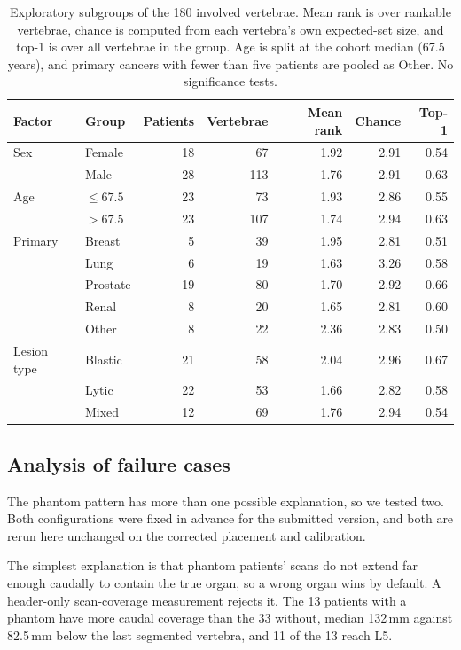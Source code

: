 \documentclass[10pt]{article}
\begin{document}
\begin{table}[!htbp]
\centering
\small
\caption{Exploratory subgroups of the 180 involved vertebrae. Mean rank is over
rankable vertebrae, chance is computed from each vertebra's own expected-set size,
and top-1 is over all vertebrae in the group. Age is split at the cohort median
(67.5 years), and primary cancers with fewer than five patients are pooled as Other.
No significance tests.}
\label{tab:subgroups}
\begin{tabular}{llrrrrr}
\toprule
Factor & Group & Patients & Vertebrae & Mean rank & Chance & Top-1 \\
\midrule
Sex & Female & 18 & 67 & 1.92 & 2.91 & 0.54 \\
    & Male & 28 & 113 & 1.76 & 2.91 & 0.63 \\
\midrule
Age & $\le 67.5$ & 23 & 73 & 1.93 & 2.86 & 0.55 \\
    & $> 67.5$ & 23 & 107 & 1.74 & 2.94 & 0.63 \\
\midrule
Primary & Breast & 5 & 39 & 1.95 & 2.81 & 0.51 \\
        & Lung & 6 & 19 & 1.63 & 3.26 & 0.58 \\
        & Prostate & 19 & 80 & 1.70 & 2.92 & 0.66 \\
        & Renal & 8 & 20 & 1.65 & 2.81 & 0.60 \\
        & Other & 8 & 22 & 2.36 & 2.83 & 0.50 \\
\midrule
Lesion type & Blastic & 21 & 58 & 2.04 & 2.96 & 0.67 \\
            & Lytic & 22 & 53 & 1.66 & 2.82 & 0.58 \\
            & Mixed & 12 & 69 & 1.76 & 2.94 & 0.54 \\
\bottomrule
\end{tabular}
\end{table}

\subsection{Analysis of failure cases}
\label{sec:results:negatives}

The phantom pattern has more than one possible explanation, so we tested two. Both
configurations were fixed in advance for the submitted version, and both are
rerun here unchanged on the corrected placement and calibration.

The simplest explanation is that phantom patients' scans do not extend far enough
caudally to contain the true organ, so a wrong organ wins by default. A
header-only scan-coverage measurement rejects it. The 13 patients with a phantom
have more caudal coverage than the 33 without, median 132\,mm against 82.5\,mm
below the last segmented vertebra, and 11 of the 13 reach L5.
\end{document}
